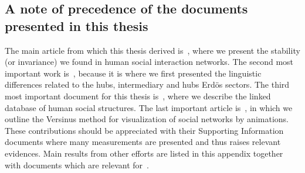 \begin{apendicesenv}
\section{A note of precedence of the documents presented in this thesis}
The main article from which this thesis derived is~\cite{stab},
where we present the stability (or invariance) we found in human social interaction networks.
The second most important work is~\cite{rcText}, because it is where we
first presented the linguistic differences related to the hubs, intermediary and hubs
Erd\"os sectors.
The third most important document for this thesis is~\cite{losd}, where we
describe the linked database of human social structures.
The last important article is~\cite{versinus}, in which we outline the Versinus method for visualization
of social networks by animations.
These contributions should be appreciated with their Supporting Information documents
where many measurements are presented and thus raises relevant evidences.
Main results from other efforts are listed in this appendix together with documents which
are relevant for~\cite{stab,rcText,losd,versinus}.

\end{apendicesenv}

